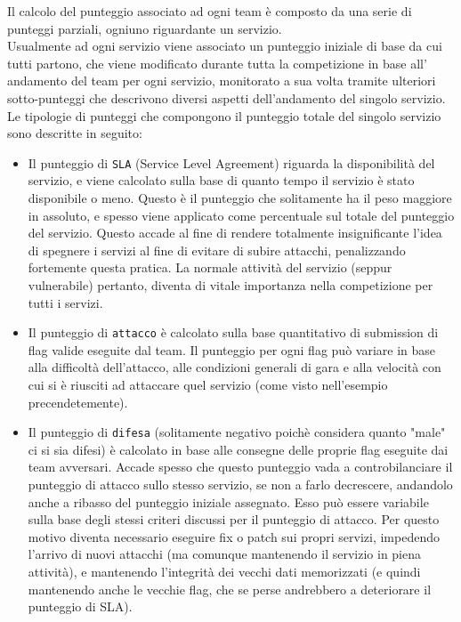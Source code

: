 Il calcolo del punteggio associato ad ogni team è composto da una serie di punteggi parziali, ogniuno riguardante un servizio.\\
Usualmente ad ogni servizio viene associato un punteggio iniziale di base da cui tutti partono, che viene modificato durante tutta la competizione in base all'
andamento del team per ogni servizio, monitorato a sua volta tramite ulteriori sotto-punteggi che descrivono diversi aspetti dell'andamento del singolo servizio.
Le tipologie di punteggi che compongono il punteggio totale del singolo servizio sono descritte in seguito:
\begin{itemize}
    \setlength{\itemsep}{5pt}
    \setlength{\parskip}{5pt}
    \item Il punteggio di \texttt{SLA} (Service Level Agreement) riguarda la disponibilità del servizio, e viene calcolato sulla base di quanto tempo il servizio è stato disponibile o meno.
    Questo è il punteggio che solitamente ha il peso maggiore in assoluto, e spesso viene applicato come percentuale sul totale del punteggio del servizio. Questo accade al fine di
    rendere totalmente insignificante l'idea di spegnere i servizi al fine di evitare di subire attacchi, penalizzando fortemente questa pratica.
    La normale attività del servizio (seppur vulnerabile) pertanto, diventa di vitale importanza nella competizione per tutti i servizi.
    \item Il punteggio di \texttt{attacco} è calcolato sulla base quantitativo di submission di flag valide eseguite dal team. Il punteggio per ogni flag può variare in base alla difficoltà dell'attacco,
    alle condizioni generali di gara e alla velocità con cui si è riusciti ad attaccare quel servizio (come visto nell'esempio precendetemente).
    \item Il punteggio di \texttt{difesa} (solitamente negativo poichè considera quanto "male" ci si sia difesi) è calcolato in base alle consegne
    delle proprie flag eseguite dai team avversari. Accade spesso che questo punteggio vada a controbilanciare il punteggio di attacco sullo stesso servizio, se non a farlo decrescere, andandolo anche a
    ribasso del punteggio iniziale assegnato. Esso può essere variabile sulla base degli stessi criteri discussi per il punteggio di attacco. Per questo motivo diventa necessario eseguire
    fix o patch sui propri servizi, impedendo l'arrivo di nuovi attacchi (ma comunque mantenendo il servizio in piena attività),
    e mantenendo l'integrità dei vecchi dati memorizzati (e quindi mantenendo anche le vecchie flag, che se perse andrebbero a deteriorare il punteggio di SLA).
\end{itemize}

